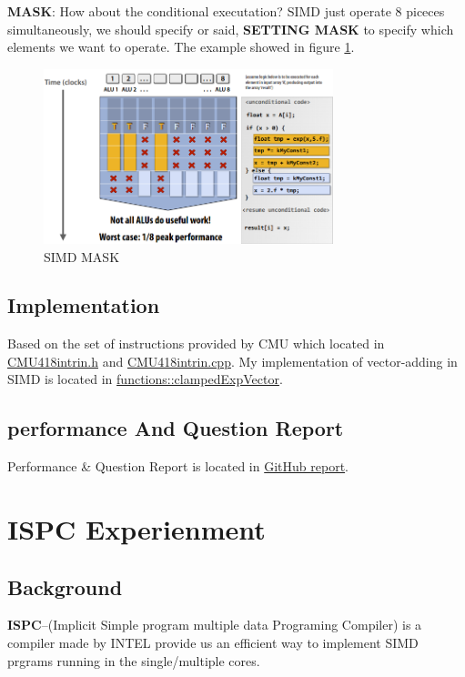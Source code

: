 \documentclass[a4paper]{article}
\begin{document}
\textbf{MASK}: How about the conditional executation? SIMD just operate 8 piceces simultaneously, we should specify or said, \textbf{SETTING MASK} to specify which elements we want to operate. The example showed in figure \ref{fig:MASK}.

\begin{figure}[h]
    \centering
    \includegraphics[width=0.75\textwidth]{figures/MASK.png}
    \caption{SIMD MASK}
    \label{fig:MASK}
\end{figure}

\subsection{Implementation}
Based on the set of instructions provided by CMU which located in \href{https://github.com/GiganticRay/CMU-418618HW/blob/main/asst1-f18/prog2_vecintrin/CMU418intrin.h}{CMU418intrin.h} and \href{https://github.com/GiganticRay/CMU-418618HW/blob/main/asst1-f18/prog2_vecintrin/CMU418intrin.cpp}{CMU418intrin.cpp}. My implementation of vector-adding in SIMD is located in \href{https://github.com/GiganticRay/CMU-418618HW/blob/main/asst1-f18/prog2_vecintrin/functions.cpp}{functions::clampedExpVector}.

\subsection{performance And Question Report}
Performance \& Question Report is located in \href{https://github.com/GiganticRay/CMU-418618HW/blob/main/asst1-f18/prog2_vecintrin/report2.txt}{GitHub report}.

\section{ISPC Experienment}
\subsection{Background}
\textbf{ISPC}--(Implicit Simple program multiple data Programing Compiler) is a compiler made by INTEL provide us an efficient way to implement SIMD prgrams running in the single/multiple cores. 
\end{document}
